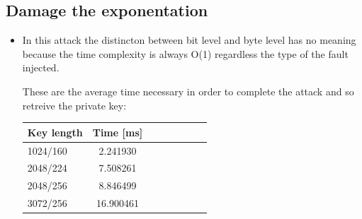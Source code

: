 \documentclass[11pt,english]{article}
\begin{document}
\subsection{Damage the exponentation}
\begin{itemize}
\item In this attack the distincton between bit level and byte level has no meaning because the time complexity is always O(1) regardless the type of the fault injected. 

These are the average time necessary in order to complete the attack and so retreive the private key:

\begin{center}
\begin{tabular}{l*{6}{c}r}
Key length        & Time [ms] \\
\hline
1024/160 &       2.241930  \\
2048/224 &       7.508261  \\
2048/256 &       8.846499  \\
3072/256 &      16.900461 \\ 
\end{tabular}
\end{center}

\end{itemize}
\end{document}
